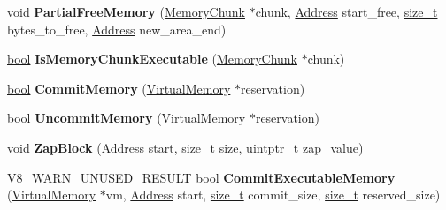\begin{DoxyCompactItemize}
\item 
\mbox{\label{classv8_1_1internal_1_1MemoryAllocator_a0afb973edac68394d0355cdfec1928f5}} 
void {\bfseries Partial\+Free\+Memory} (\mbox{\hyperlink{classv8_1_1internal_1_1MemoryChunk}{Memory\+Chunk}} $\ast$chunk, \mbox{\hyperlink{classuintptr__t}{Address}} start\+\_\+free, \mbox{\hyperlink{classsize__t}{size\+\_\+t}} bytes\+\_\+to\+\_\+free, \mbox{\hyperlink{classuintptr__t}{Address}} new\+\_\+area\+\_\+end)
\item 
\mbox{\label{classv8_1_1internal_1_1MemoryAllocator_afc4f762e2a1808e983bed027fed42607}} 
\mbox{\hyperlink{classbool}{bool}} {\bfseries Is\+Memory\+Chunk\+Executable} (\mbox{\hyperlink{classv8_1_1internal_1_1MemoryChunk}{Memory\+Chunk}} $\ast$chunk)
\item 
\mbox{\label{classv8_1_1internal_1_1MemoryAllocator_ac05a8410e67e0305c36b562b788369a3}} 
\mbox{\hyperlink{classbool}{bool}} {\bfseries Commit\+Memory} (\mbox{\hyperlink{classv8_1_1internal_1_1VirtualMemory}{Virtual\+Memory}} $\ast$reservation)
\item 
\mbox{\label{classv8_1_1internal_1_1MemoryAllocator_a4affd8ca0efc82342fafbe4f8b448fa2}} 
\mbox{\hyperlink{classbool}{bool}} {\bfseries Uncommit\+Memory} (\mbox{\hyperlink{classv8_1_1internal_1_1VirtualMemory}{Virtual\+Memory}} $\ast$reservation)
\item 
\mbox{\label{classv8_1_1internal_1_1MemoryAllocator_ab5e6daa3ddeaf66910cf277d645ec5fe}} 
void {\bfseries Zap\+Block} (\mbox{\hyperlink{classuintptr__t}{Address}} start, \mbox{\hyperlink{classsize__t}{size\+\_\+t}} size, \mbox{\hyperlink{classuintptr__t}{uintptr\+\_\+t}} zap\+\_\+value)
\item 
\mbox{\label{classv8_1_1internal_1_1MemoryAllocator_a983e0f6ef099c24fe058f60cf634c9be}} 
V8\+\_\+\+W\+A\+R\+N\+\_\+\+U\+N\+U\+S\+E\+D\+\_\+\+R\+E\+S\+U\+LT \mbox{\hyperlink{classbool}{bool}} {\bfseries Commit\+Executable\+Memory} (\mbox{\hyperlink{classv8_1_1internal_1_1VirtualMemory}{Virtual\+Memory}} $\ast$vm, \mbox{\hyperlink{classuintptr__t}{Address}} start, \mbox{\hyperlink{classsize__t}{size\+\_\+t}} commit\+\_\+size, \mbox{\hyperlink{classsize__t}{size\+\_\+t}} reserved\+\_\+size)

\end{DoxyCompactItemize}
